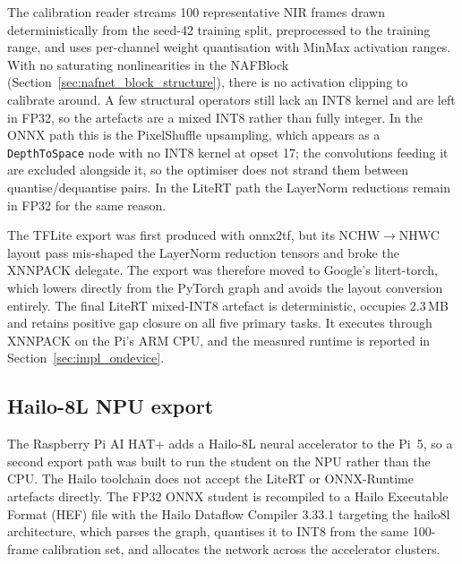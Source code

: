 The calibration reader streams 100 representative NIR frames drawn deterministically from the seed-42 training split, preprocessed to the training range, and uses per-channel weight quantisation with MinMax activation ranges. With no saturating nonlinearities in the NAFBlock (Section~\ref{sec:nafnet_block_structure}), there is no activation clipping to calibrate around. A few structural operators still lack an INT8 kernel and are left in FP32, so the artefacts are a mixed INT8 rather than fully integer. In the ONNX path this is the PixelShuffle upsampling, which appears as a \texttt{DepthToSpace} node with no INT8 kernel at opset 17; the convolutions feeding it are excluded alongside it, so the optimiser does not strand them between quantise/dequantise pairs. In the LiteRT path the LayerNorm reductions remain in FP32 for the same reason.

The TFLite export was first produced with onnx2tf, but its NCHW$\rightarrow$NHWC layout pass mis-shaped the LayerNorm reduction tensors and broke the XNNPACK delegate. The export was therefore moved to Google's litert-torch, which lowers directly from the PyTorch graph and avoids the layout conversion entirely. The final LiteRT mixed-INT8 artefact is deterministic, occupies 2.3\,MB and retains positive gap closure on all five primary tasks. It executes through XNNPACK on the Pi's ARM CPU, and the measured runtime is reported in Section~\ref{sec:impl_ondevice}.

\subsection{Hailo-8L NPU export}
\label{sec:impl_hailo}

The Raspberry Pi AI HAT+ adds a Hailo-8L neural accelerator to the Pi~5, so a second export path was built to run the student on the NPU rather than the CPU. The Hailo toolchain does not accept the LiteRT or ONNX-Runtime artefacts directly. The FP32 ONNX student is recompiled to a Hailo Executable Format (HEF) file with the Hailo Dataflow Compiler 3.33.1 targeting the hailo8l architecture, which parses the graph, quantises it to INT8 from the same 100-frame calibration set, and allocates the network across the accelerator clusters.

